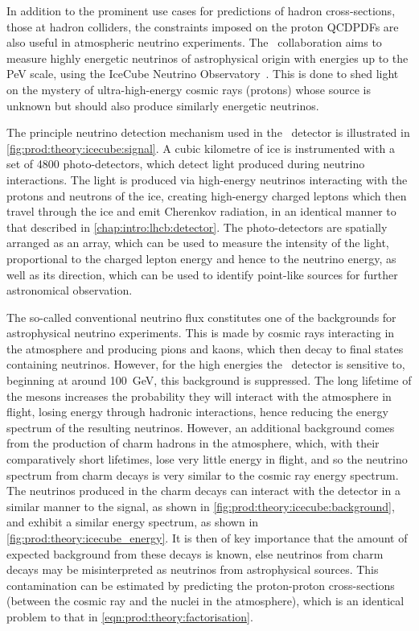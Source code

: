 In addition to the prominent use cases for predictions of hadron 
cross-sections, those at hadron colliders, the constraints imposed on the 
proton \acp{QCDPDF} are also useful in atmospheric neutrino experiments.
The \icecube\ collaboration aims to measure highly energetic neutrinos of 
astrophysical origin with energies up to the \si{\peta\eV} scale, using the 
IceCube Neutrino Observatory~\cite{Achterberg:2006md}.
This is done to shed light on the mystery of ultra-high-energy cosmic rays 
(protons) whose source is unknown but should also produce similarly energetic
neutrinos.

The principle neutrino detection mechanism used in the \icecube\ detector is 
illustrated in \cref{fig:prod:theory:icecube:signal}.
A cubic kilometre of ice is instrumented with a set of \num{4800} 
photo-detectors, which detect light produced during neutrino interactions.
The light is produced via high-energy neutrinos interacting with the protons 
and neutrons of the ice, creating high-energy charged leptons which then travel 
through the ice and emit Cherenkov radiation, in an identical manner to that 
described in \cref{chap:intro:lhcb:detector}.
The photo-detectors are spatially arranged as an array, which can be used to 
measure the intensity of the light, proportional to the charged lepton energy 
and hence to the neutrino energy, as well as its direction, which can be used 
to identify point-like sources for further astronomical observation.

The so-called conventional neutrino flux constitutes one of the backgrounds for 
astrophysical neutrino experiments.
This is made by cosmic rays interacting in the atmosphere and producing pions 
and kaons, which then decay to final states containing neutrinos.
However, for the high energies the \icecube\ detector is sensitive to, 
beginning at around \SI{100}{\GeV}, this background is suppressed.
The long lifetime of the mesons increases the probability they will interact 
with the atmosphere in flight, losing energy through hadronic interactions, 
hence reducing the energy spectrum of the resulting neutrinos.
However, an additional background comes from the production of charm hadrons in 
the atmosphere, which, with their comparatively short lifetimes, lose very 
little energy in flight, and so the neutrino spectrum from charm decays is very 
similar to the cosmic ray energy spectrum.
The neutrinos produced in the charm decays can interact with the detector in a 
similar manner to the signal, as shown in 
\cref{fig:prod:theory:icecube:background}, and exhibit a similar energy 
spectrum, as shown in \cref{fig:prod:theory:icecube_energy}.
It is then of key importance that the amount of expected background from these 
decays is known, else neutrinos from charm decays may be misinterpreted as 
neutrinos from astrophysical sources.
This contamination can be estimated by predicting the proton-proton 
cross-sections (between the cosmic ray and the nuclei in the atmosphere), which 
is an identical problem to that in \cref{eqn:prod:theory:factorisation}.

